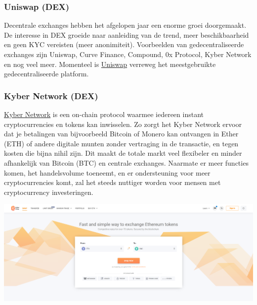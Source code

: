 \subsubsection*{Uniswap (DEX)}
Decentrale exchanges hebben het afgelopen jaar een enorme groei doorgemaakt. De interesse in DEX groeide naar aanleiding van de trend, meer beschikbaarheid en geen KYC vereisten (meer anonimiteit). Voorbeelden van gedecentraliseerde exchanges zijn Uniswap, Curve Finance, Compound, 0x Protocol, Kyber Network en nog veel meer. Momenteel is \href{https://uniswap.org}{Uniswap} verreweg het meestgebruikte gedecentraliseerde platform.


\subsubsection*{Kyber Network (DEX)}
\href{https://www.kyber.network}{Kyber Network} is een on-chain protocol waarmee iedereen instant cryptocurrencies en tokens kan inwisselen. Zo zorgt het Kyber Network ervoor dat je betalingen van bijvoorbeeld Bitcoin of Monero kan ontvangen in Ether (ETH) of andere digitale munten zonder vertraging in de transactie, en tegen kosten die bijna nihil zijn. Dit maakt de totale markt veel flexibeler en minder afhankelijk van Bitcoin (BTC) en centrale exchanges. Naarmate er meer functies komen, het handelsvolume toeneemt, en er ondersteuning voor meer cryptocurrencies komt, zal het steeds nuttiger worden voor mensen met cryptocurrency investeringen.\medskip

\begin{borderbox}
    \includegraphics[width=\textwidth]{img/ch-exchanges/kyber_swap.png}
\end{borderbox}

\newpage

